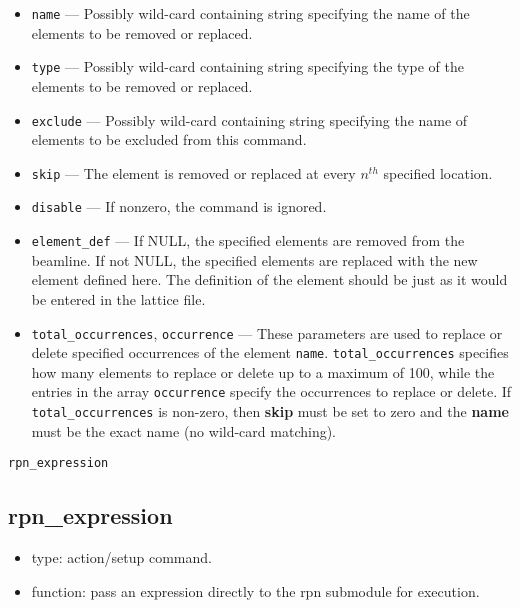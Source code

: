 \documentclass[11pt]{article}
\begin{document}
\begin{itemize}
\item \verb|name| --- Possibly wild-card containing string specifying the
	name of the elements to be removed or replaced.
\item \verb|type| --- Possibly wild-card containing string specifying the
   type of the elements to be removed or replaced.
\item \verb|exclude| --- Possibly wild-card containing string specifying 
	the name of elements to be excluded from this command.
\item \verb|skip| --- The element is removed or replaced at every $n^{th}$ 
   specified location.
\item \verb|disable| --- If nonzero, the command is ignored.
\item \verb|element_def| --- If NULL, the specified elements are removed from
   the beamline. If not NULL, the specified elements are replaced with the new element
   defined here. The definition of the element should be just as it would be entered in 
   the lattice file.
\item \verb|total_occurrences|, \verb|occurrence| --- 
These parameters are used to replace or delete specified occurrences of 
the element \verb|name|.  \verb|total_occurrences| specifies how many elements to replace
or delete up to a maximum of 100, while the entries in the array \verb|occurrence| specify the occurrences
to replace or delete. If \verb|total_occurrences| is non-zero, then {\bf skip} must
be set to zero  and the {\bf name} must be the exact name (no wild-card matching). 
\end{itemize}

\newpage
\begin{center}{\Large\verb|rpn_expression|}\end{center}
\subsection{rpn\_expression \label{subsec:rpnexpression}}

\begin{itemize}
\item type: action/setup command.
\item function: pass an expression directly to the rpn submodule for execution.
\end{itemize}
\end{document}
